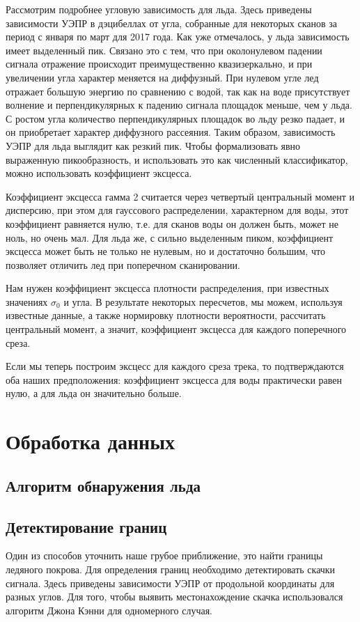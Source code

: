 Рассмотрим подробнее угловую зависимость для льда.  
Здесь приведены зависимости УЭПР в дэцибеллах от угла, собранные для некоторых сканов за период с января по март для 2017 года.
Как уже отмечалось, у льда зависимость имеет выделенный пик. Связано это с тем, что при околонулевом падении сигнала
отражение происходит преимущественно квазизеркально, и при увеличении угла характер меняется на диффузный. При нулевом
угле лед отражает большую энергию по сравнению с водой, так как на воде присутствует волнение и перпендикулярных к
падению сигнала площадок меньше, чем у льда. С ростом угла количество перпендикулярных площадок во льду резко падает, и
он приобретает характер диффузного рассеяния. Таким образом, зависимость УЭПР для льда выглядит как резкий пик. Чтобы
формализовать явно выраженную пикообразность, и использовать это как численный классификатор, можно использовать
коэффициент эксцесса.


Коэффициент эксцесса гамма 2 считается через четвертый центральный момент и дисперсию, при этом для гауссового
распределении, характерном для воды, этот коэффициент равняется нулю, т.е. для сканов воды он должен быть, может не
ноль, но очень мал. Для льда же, с сильно выделенным пиком, коэффициент эксцесса может быть не только не нулевым, но и
достаточно большим, что позволяет отличить лед при поперечном сканировании. 

Нам нужен коэффициент эксцесса плотности распределения, при известных значениях $\sigma_0$ и угла. В результате некоторых
пересчетов, мы можем, используя известные данные, а также нормировку плотности вероятности, рассчитать центральный
момент, а значит, коэффициент эксцесса для каждого поперечного среза. 

Если мы теперь построим эксцесс для каждого среза трека, то подтверждаются оба наших предположения: коэффициент эксцесса
для воды практически равен нулю, а для льда он значительно больше.



\section{Обработка данных}
\subsection{Алгоритм обнаружения льда}

\subsection{Детектирование границ}
Один из способов уточнить наше грубое приближение, это найти границы ледяного покрова.
Для определения границ необходимо детектировать скачки сигнала. Здесь приведены зависимости УЭПР от продольной
координаты для разных углов. Для того, чтобы выявить местонахождение скачка использовался алгоритм Джона Кэнни \cite{canny} для
одномерного случая.

